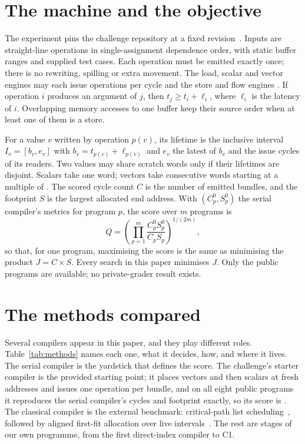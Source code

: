 \documentclass[11pt,a4paper]{article}
\begin{document}
\section{The machine and the objective}\label{sec:machine}

The experiment pins the challenge repository at a fixed revision~\cite{luminal}.
Inputs are straight-line operations in single-assignment dependence order, with
static buffer ranges and supplied test cases. Each operation must be emitted
exactly once; there is no rewriting, spilling or extra movement. The load, scalar
and vector engines may each issue  operations per cycle and the store
and flow engines . If operation $i$ produces an argument of $j$, then
$t_j\geq t_i+\ell_i$, where $\ell_i$ is the latency of $i$. Overlapping memory
accesses to one buffer keep their source order when at least one of them is a
store.

For a value $v$ written by operation $p(v)$, its lifetime is the inclusive
interval $I_v=[b_v,e_v]$ with $b_v=t_{p(v)}+\ell_{p(v)}$ and $e_v$ the latest of
$b_v$ and the issue cycles of its readers. Two values may share scratch words only
if their lifetimes are disjoint. Scalars take one word; vectors take 
consecutive words starting at a multiple of . The scored cycle count $C$
is the number of emitted bundles, and the footprint $S$ is the largest allocated
end address. With $(C^0_p,S^0_p)$ the serial compiler's metrics for program $p$,
the score over $m$ programs is
\begin{equation}\label{eq:score}
Q=\left(\prod_{p=1}^{m}\frac{C^0_pS^0_p}{C_pS_p}\right)^{1/(2m)} ,
\end{equation}
so that, for one program, maximising the score is the same as minimising the
product $J=C\times S$. Every search in this paper minimises $J$. Only the
 public programs are available; no private-grader result exists.

\section{The methods compared}\label{sec:methods}

Several compilers appear in this paper, and they play different roles.
Table~\ref{tab:methods} names each one, what it decides, how, and where it lives.
The serial compiler is the yardstick that defines the score. The challenge's
starter compiler is the provided starting point; it places vectors and then
scalars at fresh addresses and issues one operation per bundle, and on all eight
public programs it reproduces the serial compiler's cycles and footprint exactly,
so its score is . The classical compiler is the external
benchmark: critical-path list scheduling~\cite{graham1969,gibbons1986}, followed by
aligned first-fit allocation over live intervals~\cite{poletto1999}. The rest are
stages of our own programme, from the first direct-index compiler to C1.
\end{document}
